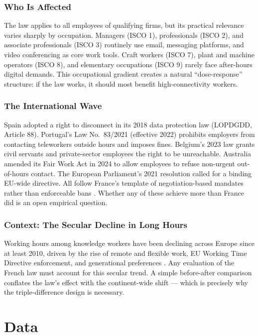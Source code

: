 \documentclass[12pt]{article}
\begin{document}
\subsubsection*{Who Is Affected} The law applies to all employees of qualifying firms, but its practical relevance varies sharply by occupation. Managers (ISCO 1), professionals (ISCO 2), and associate professionals (ISCO 3) routinely use email, messaging platforms, and video conferencing as core work tools. Craft workers (ISCO 7), plant and machine operators (ISCO 8), and elementary occupations (ISCO 9) rarely face after-hours digital demands. This occupational gradient creates a natural ``dose-response'' structure: if the law works, it should most benefit high-connectivity workers.

\subsubsection*{The International Wave} Spain adopted a right to disconnect in its 2018 data protection law (LOPDGDD, Article 88). Portugal's Law No.\ 83/2021 (effective 2022) prohibits employers from contacting teleworkers outside hours and imposes fines. Belgium's 2023 law grants civil servants and private-sector employees the right to be unreachable. Australia amended its Fair Work Act in 2024 to allow employees to refuse non-urgent out-of-hours contact. The European Parliament's 2021 resolution called for a binding EU-wide directive. All follow France's template of negotiation-based mandates rather than enforceable bans \citep{epresolution2021, ilo2023disconnect}. Whether any of these achieve more than France did is an open empirical question.

\subsubsection*{Context: The Secular Decline in Long Hours} Working hours among knowledge workers have been declining across Europe since at least 2010, driven by the rise of remote and flexible work, EU Working Time Directive enforcement, and generational preferences \citep{eurofound2022telework}. Any evaluation of the French law must account for this secular trend. A simple before-after comparison conflates the law's effect with the continent-wide shift --- which is precisely why the triple-difference design is necessary.


\section{Data}
\end{document}
